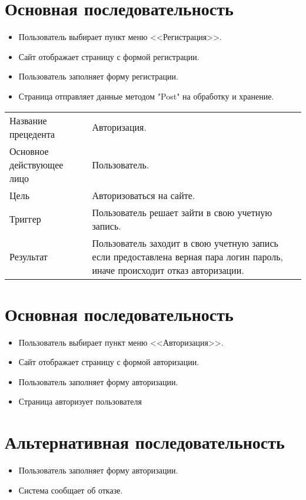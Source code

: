 \section{Основная последовательность}
\begin{itemize}
    \item Пользователь выбирает пункт меню <<Регистрация>>.
    \item Сайт отображает страницу с формой регистрации.
    \item Пользователь заполняет форму регистрации.
    \item Страница отправляет данные методом "Post" на обработку и хранение. 
\end{itemize}

\begin{table}[]
    \begin{tabular}{ll}
    Название прецедента       & Авторизация.\\
    Основное действующее лицо & Пользователь.\\
    Цель                      & Авторизоваться на сайте.\\
    Триггер                   & Пользователь решает зайти в свою учетную запись.\\
    Результат                 & Пользователь заходит в свою учетную запись если предоставлена верная пара логин пароль, иначе происходит отказ авторизации. 
    \end{tabular}
\end{table}

\section{Основная последовательность}
\begin{itemize}
    \item Пользователь выбирает пункт меню <<Авторизация>>.
    \item Сайт отображает страницу с формой авторизации.
    \item Пользователь заполняет форму авторизации.
    \item Страница авторизует пользователя
\end{itemize}
\section{Альтернативная последовательность}
\begin{itemize}
    \item Пользователь заполняет форму авторизации.
    \item Система сообщает об отказе.
\end{itemize}


